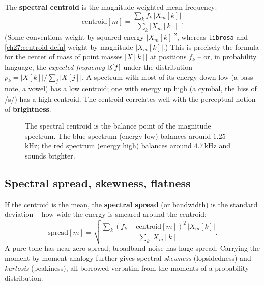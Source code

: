 The \textbf{spectral centroid} is the magnitude-weighted mean frequency:
\begin{equation}
\label{ch27:centroid-defn}
\text{centroid}[m] = \frac{\sum_k f_k\, |X_m[k]|}{\sum_k |X_m[k]|}.
\end{equation}
(Some conventions weight by squared energy $|X_m[k]|^2$, whereas \texttt{librosa} and \eqref{ch27:centroid-defn} weight by magnitude $|X_m[k]|$.) This is precisely the formula for the center of mass of point masses $|X[k]|$ at
positions $f_k$ -- or, in probability language, the \emph{expected frequency}
$\operatorname{\mathbb{E}}[f]$ under the distribution $p_k = |X[k]| / \sum_j |X[j]|$. A spectrum with most
of its energy down low (a bass note, a vowel) has a low centroid; one with energy
up high (a cymbal, the hiss of /s/) has a high centroid. The centroid correlates
well with the perceptual notion of \textbf{brightness}.

\begin{figure}[H]
\centering
{}
\caption{The spectral centroid is the balance point of the magnitude spectrum.
The blue spectrum (energy low) balances around $1.25$\,kHz; the red spectrum
(energy high) balances around $4.7$\,kHz and sounds brighter.}
\label{ch27:fig-centroid}
\end{figure}

\subsection*{Spectral spread, skewness, flatness}

If the centroid is the mean, the \textbf{spectral spread} (or bandwidth) is the
standard deviation -- how wide the energy is smeared around the centroid:
\begin{equation}
\label{ch27:spread-defn}
\text{spread}[m] = \sqrt{\frac{\sum_k (f_k - \text{centroid}[m])^2\,|X_m[k]|}
                              {\sum_k |X_m[k]|}}.
\end{equation}
A pure tone has near-zero spread; broadband noise has huge spread. Carrying the
moment-by-moment analogy further gives spectral \emph{skewness} (lopsidedness) and
\emph{kurtosis} (peakiness), all borrowed verbatim from the moments of a
probability distribution.

